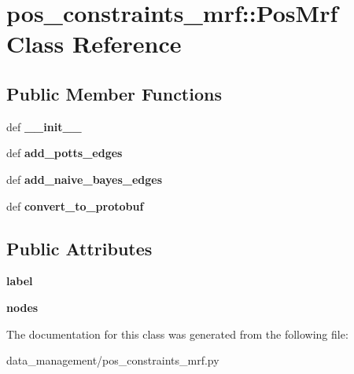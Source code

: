 \hypertarget{classpos__constraints__mrf_1_1PosMrf}{
\section{pos\_\-constraints\_\-mrf::PosMrf Class Reference}
\label{classpos__constraints__mrf_1_1PosMrf}
}
\subsection*{Public Member Functions}
\begin{DoxyCompactItemize}
\item 
\hypertarget{classpos__constraints__mrf_1_1PosMrf_a0a036f61955e96161a2f4888198668f1}{
def {\bfseries \_\-\_\-init\_\-\_\-}}
\label{classpos__constraints__mrf_1_1PosMrf_a0a036f61955e96161a2f4888198668f1}

\item 
\hypertarget{classpos__constraints__mrf_1_1PosMrf_a7a3af0e7a22eea7bcfb579436482fd09}{
def {\bfseries add\_\-potts\_\-edges}}
\label{classpos__constraints__mrf_1_1PosMrf_a7a3af0e7a22eea7bcfb579436482fd09}

\item 
\hypertarget{classpos__constraints__mrf_1_1PosMrf_a920e4f4d5f47079a4f7dabd92728483b}{
def {\bfseries add\_\-naive\_\-bayes\_\-edges}}
\label{classpos__constraints__mrf_1_1PosMrf_a920e4f4d5f47079a4f7dabd92728483b}

\item 
\hypertarget{classpos__constraints__mrf_1_1PosMrf_af54eb741fae5ed08c26963c0f84b8999}{
def {\bfseries convert\_\-to\_\-protobuf}}
\label{classpos__constraints__mrf_1_1PosMrf_af54eb741fae5ed08c26963c0f84b8999}

\end{DoxyCompactItemize}
\subsection*{Public Attributes}
\begin{DoxyCompactItemize}
\item 
\hypertarget{classpos__constraints__mrf_1_1PosMrf_a5fc6565b99afc2c10ceb6ecd9420e342}{
{\bfseries label}}
\label{classpos__constraints__mrf_1_1PosMrf_a5fc6565b99afc2c10ceb6ecd9420e342}

\item 
\hypertarget{classpos__constraints__mrf_1_1PosMrf_ad818bb6139a315eb70390ad881b6783a}{
{\bfseries nodes}}
\label{classpos__constraints__mrf_1_1PosMrf_ad818bb6139a315eb70390ad881b6783a}

\end{DoxyCompactItemize}


The documentation for this class was generated from the following file:\begin{DoxyCompactItemize}
\item 
data\_\-management/pos\_\-constraints\_\-mrf.py\end{DoxyCompactItemize}
